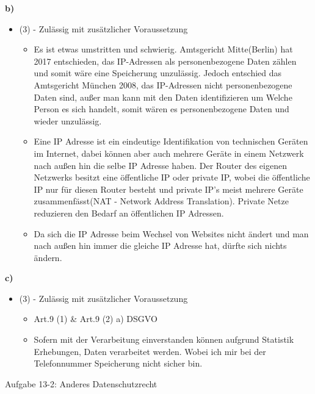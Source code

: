 \documentclass[a4paper]{assignment}
\begin{document}
\begin{problemlist}
\begin{problem}
\begin{answer}
				\textbf{b)}
				\begin{itemize}
					\item (3) - Zulässig mit zusätzlicher Voraussetzung
					\begin{itemize}
						\item Es ist etwas umstritten und schwierig. Amtsgericht Mitte(Berlin) hat 2017 entschieden, das IP-Adressen als personenbezogene Daten zählen und somit wäre eine Speicherung unzulässig. Jedoch entschied das Amtsgericht München 2008, das IP-Adressen nicht personenbezogene Daten sind, außer man kann mit den Daten identifizieren um Welche Person es sich handelt, somit wären es personenbezogene Daten und wieder unzulässig.\cite{wiki-ip-adressen}
						\item Eine IP Adresse ist ein eindeutige Identifikation von technischen Geräten im Internet, dabei können aber auch mehrere Geräte in einem Netzwerk nach außen hin die selbe IP Adresse haben. Der Router des eigenen Netzwerks besitzt eine öffentliche IP oder private IP, wobei die öffentliche IP nur für diesen Router besteht und private IP's meist mehrere Geräte zusammenfässt(NAT - Network Address Translation). Private Netze reduzieren den Bedarf an öffentlichen IP Adressen.
						\item Da sich die IP Adresse beim Wechsel von Websites nicht ändert und man nach außen hin immer die gleiche IP Adresse hat, dürfte sich nichts ändern.\cite{wiki-ip-adressen}
					\end{itemize}
				\end{itemize}

				\textbf{c)}
				\begin{itemize}
					\item (3) - Zulässig mit zusätzlicher Voraussetzung
					\begin{itemize}
						\item Art.9 (1) \& Art.9 (2) a) DSGVO\cite{dsgvo9}
						\item Sofern mit der Verarbeitung einverstanden können aufgrund Statistik Erhebungen, Daten verarbeitet werden. Wobei ich mir bei der Telefonnummer Speicherung nicht sicher bin.
					\end{itemize}
				\end{itemize}								
			\end{answer}
		\end{problem}
		
		\pbitem Aufgabe 13-2: Anderes Datenschutzrecht
		\begin{problem}
		

\end{problem}
\end{problemlist}
\end{document}
